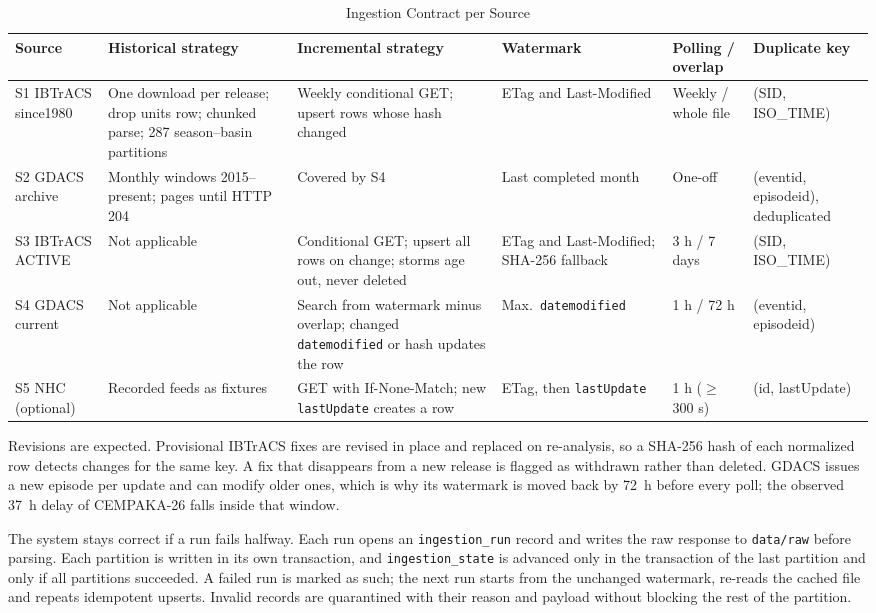 \documentclass[10pt,twocolumn,letterpaper]{article}
\newcommand{\code}[1]{\texttt{\footnotesize #1}}
\begin{document}
\begin{table}[t]
\caption{Ingestion Contract per Source}\label{tab:contract}
\centering\footnotesize
\begin{tabularx}{\textwidth}{@{}L{2.0cm}L{3.7cm}L{3.7cm}L{2.5cm}L{1.6cm}Y@{}}
\toprule
Source & Historical strategy & Incremental strategy & Watermark & Polling / overlap & Duplicate key\\
\midrule
S1 IBTrACS since1980 & One download per release; drop units row; chunked parse; 287 season--basin partitions & Weekly conditional GET; upsert rows whose hash changed & ETag and Last-Modified & Weekly / whole file & (SID, ISO\_TIME)\\
S2 GDACS archive & Monthly windows 2015--present; pages until HTTP 204 & Covered by S4 & Last completed month & One-off & (eventid, episodeid), deduplicated\\
S3 IBTrACS ACTIVE & Not applicable & Conditional GET; upsert all rows on change; storms age out, never deleted & ETag and Last-Modified; SHA-256 fallback & 3 h / 7 days & (SID, ISO\_TIME)\\
S4 GDACS current & Not applicable & Search from watermark minus overlap; changed \code{datemodified} or hash updates the row & Max.\ \code{datemodified} & 1 h / 72 h & (eventid, episodeid)\\
S5 NHC (optional) & Recorded feeds as fixtures & GET with If-None-Match; new \code{lastUpdate} creates a row & ETag, then \code{lastUpdate} & 1 h ($\geq$ 300 s) & (id, lastUpdate)\\
\bottomrule
\end{tabularx}
\end{table}

Revisions are expected. Provisional IBTrACS fixes are revised in place and replaced on re-analysis, so a SHA-256 hash of each normalized row detects changes for the same key. A fix that disappears from a new release is flagged as withdrawn rather than deleted. GDACS issues a new episode per update and can modify older ones, which is why its watermark is moved back by 72~h before every poll; the observed 37~h delay of CEMPAKA-26 falls inside that window.

The system stays correct if a run fails halfway. Each run opens an \code{ingestion\_run} record and writes the raw response to \code{data/raw} before parsing. Each partition is written in its own transaction, and \code{ingestion\_state} is advanced only in the transaction of the last partition and only if all partitions succeeded. A failed run is marked as such; the next run starts from the unchanged watermark, re-reads the cached file and repeats idempotent upserts. Invalid records are quarantined with their reason and payload without blocking the rest of the partition.
\end{document}
